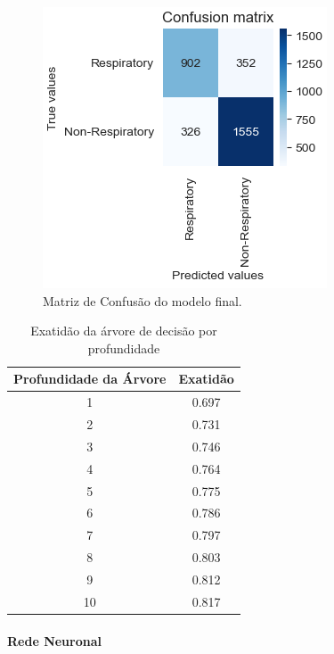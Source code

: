 \documentclass[conference]{IEEEtran}
\begin{document}
\begin{figure}[h]
	\centering
	\includegraphics[width=0.8\linewidth]{arvoreDecisaoCM}
	\caption{Matriz de Confusão do modelo final.}
	\label{fig:arvoreDecisaoCM}
\end{figure}


\begin{table}[ht]
	\centering
	\caption{Exatidão da árvore de decisão por profundidade}
	\begin{tabular}{|c|c|}
		\hline
		\textbf{Profundidade da Árvore} & \textbf{Exatidão} \\
		\hline
		1  & 0.697 \\
		2  & 0.731 \\
		3  & 0.746 \\
		4  & 0.764 \\
		5  & 0.775 \\
		6  & 0.786 \\
		7  & 0.797 \\
		8  & 0.803 \\
		9  & 0.812 \\
		10 & 0.817 \\
		\hline
	\end{tabular}
	\label{tab:acc_tree_depth}
\end{table}

\medskip

\paragraph{Rede Neuronal}
\end{document}
